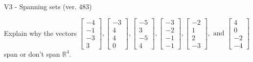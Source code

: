 \begin{exercise}
  \begin{exerciseTitle}V3 - Spanning sets (ver. 483)\end{exerciseTitle}
  \begin{exerciseStatement}
    Explain why the vectors \(\left[\begin{array}{r}
-4 \\
-1 \\
-3 \\
3
\end{array}\right] , \left[\begin{array}{r}
-3 \\
4 \\
4 \\
0
\end{array}\right] , \left[\begin{array}{r}
-5 \\
3 \\
-5 \\
4
\end{array}\right] , \left[\begin{array}{r}
-3 \\
-2 \\
-1 \\
-1
\end{array}\right] , \left[\begin{array}{r}
-2 \\
1 \\
2 \\
-3
\end{array}\right] , \text{ and } \left[\begin{array}{r}
4 \\
0 \\
-2 \\
-4
\end{array}\right]\) span or don't span \(\mathbb{R}^4\). 
	



\end{exerciseStatement}
\end{exercise}
